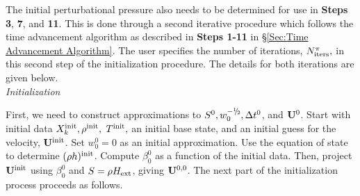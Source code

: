 The initial perturbational pressure also needs to be determined for
use in {\bf Steps 3}, {\bf 7}, and {\bf 11}. 
This is done through a second iterative procedure which follows the
time advancement algorithm as described in {\bf Steps 1-11} in 
\S \ref{Sec:Time Advancement Algorithm}.  
The user specifies the number of iterations, 
$N_{\rm iters}^{\pi},$ in this second step of the initialization procedure.
The details for both iterations are given below.\\

 {\em Initialization}

First, we need to construct approximations to $S^0, w_0^{-\myhalf}, \Delta t^0$, 
and ${\bf U}^0$.  Start with initial data $X_k^{\mathrm{init}}, \rho^{\mathrm{init}},$ $T^{\mathrm{init}},$ an 
initial base state, and an initial guess for the velocity, ${\bf U}^{\mathrm{init}}$.
Set $w_0^0 = 0$ as an initial approximation.  Use the equation of state to 
determine $(\rho h)^{\mathrm{init}}$.  Compute $\beta_0^0$ as a function of 
the initial data.  Then, project ${\bf U}^{\mathrm{init}}$ using $\beta_0^0$ and 
$S = \rho{H_{\rm ext}}$, giving ${\bf U}^{0,0}$.  The next part of the initialization process 
proceeds as follows.

